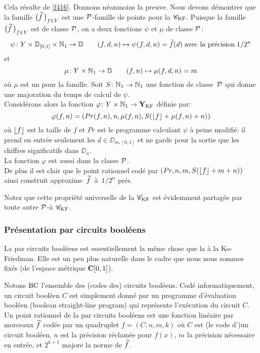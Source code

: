 \proof 
Cela résulte de \ref{f416}. Donnons néanmoins la preuve.  Nous devons démontrer 
que la famille   $\big(\widetilde{f}\,\big)_{f \in Y}$   est une ${\cal P}$-famille de points   pour la \pres  ${{{\mathscr C}}_{\rm KF}}$.  Puisque  la famille  $\big(\widetilde{f}\,\big)_{f 
\in Y}$  est \uni de classe ${\cal P}$, on a deux fonctions $\psi$ et  $\mu$  de classe  
${\cal P}$:
$$ \psi \colon  Y \times \mathbb {D}_{[0,1]} \times \mathbb {N}_1 \rightarrow \mathbb {D} \qquad  
(f,d,n) \mapsto \psi(f,d,n) = \widetilde{f}(d) \;  \hbox {avec  la  
précision} \; 1/2^n$$
et 			
$$ \mu\colon  Y \times \mathbb {N}_1 \rightarrow \mathbb {D} \qquad  (f,n) \mapsto \mu(f,d,n) = m $$
où  $\mu$  est un \mcu pour la famille.  
Soit $S \colon   \mathbb {N}_1 \rightarrow \mathbb {N}_1$   une fonction de classe~${\cal P}$  qui donne une majoration du temps de calcul de $\psi$. \\  
Considérons alors la fonction  $\varphi \colon  Y \times \mathbb {N}_1 \rightarrow {{\bf Y}_{\rm KF}} $   
définie par:
$$\varphi(f,n) = (Pr(f,n), n, \mu(f,n), S(\lfloor f \rfloor + \mu(f,n) + n))$$
où  $\lfloor f \rfloor$  est la taille de $f$ et  $Pr$  est le programme calculant 
$\psi$ à peine modifié: 
il prend en entrée seulement les  $d \in \DD_{m,[0,1]}$ et ne garde pour la sortie que les chiffres significatifs dans $\DD_n$.\\
La fonction $\varphi$  est aussi dans la classe ${\cal P}$. \\
De plus il est clair que le point rationnel codé par $(Pr, n, m, S(\lfloor f \rfloor + m+ 
n))$  ainsi construit approxime~$\widetilde f$~à~$1/2^n$   prés.  	\eop

\medskip Notez que cette propriété universelle de la \pres  ${{{\mathscr C}}_{\rm KF}}$  est évidemment 
partagée par toute autre \pres  ${\cal P}$-\equiva à  ${{{\mathscr C}}_{\rm KF}}$.

\subsubsection{Présentation  par circuits booléens} \label{fsubsubsec412}
La \pres par circuits booléens est essentiellement la même chose que la 
\pres à la Ko-Friedman. Elle est un peu plus naturelle dans le cadre que nous 
nous sommes fixés (\rp  de l'espace métrique  ${{\bf C}[0,1]}$). 

Notons   ${\rm BC}$  l'ensemble des (codes des) circuits booléens. Codé 
informatiquement, un circuit booléen  $C$  est simplement donné par un 
programme d'évaluation booléen (boolean straight-line program) qui représente l'exécution du circuit  $C$.
Un point rationnel de la \pres par circuits booléens est une fonction 
linéaire par morceaux  $\widetilde{f}$    codée par un quadruplet  
$f=(C,n,m,k)$ où $C$ est (le code d')un circuit booléen,  $n$  est la 
précision réclamée pour  $f(x)$, $m$ la précision nécessaire en 
entrée, et $2^{k+1}$  majore la norme de  $\widetilde{f}$. 

